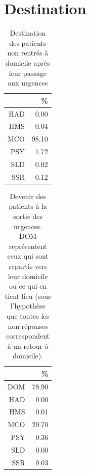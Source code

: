 \documentclass[12pt,english,french,twoside]{report}\usepackage[]{graphicx}\usepackage[]{color}
\begin{document}
\section{Destination}
\begin{table}[ht]
\centering
\begin{tabular}{rr}
  \hline
 & \% \\ 
  \hline
HAD & 0.00 \\ 
  HMS & 0.04 \\ 
  MCO & 98.10 \\ 
  PSY & 1.72 \\ 
  SLD & 0.02 \\ 
  SSR & 0.12 \\ 
   \hline
\end{tabular}
\caption{Destination des patients non rentrés à domicile après leur passage aux urgences} 
\label{tab.dest.hosp}
\end{table}
\begin{table}[ht]
\centering
\begin{tabular}{rr}
  \hline
 & \% \\ 
  \hline
DOM & 78.90 \\ 
  HAD & 0.00 \\ 
  HMS & 0.01 \\ 
  MCO & 20.70 \\ 
  PSY & 0.36 \\ 
  SLD & 0.00 \\ 
  SSR & 0.03 \\ 
   \hline
\end{tabular}
\caption{Devenir des patients à la sortie des urgences. DOM représentent ceux qui sont repartis vers leur domicile ou ce qui en tient lieu (sous l'hypothèse que toutes les non réponses correspondent à un retour à domicile).} 
\label{tab.dest}
\end{table}
\end{document}

